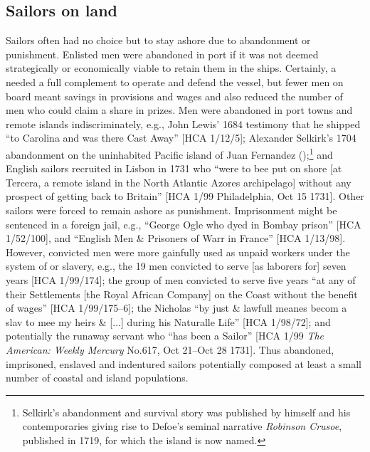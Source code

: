 \subsection{{Sailors on land}}\label{sec:4.3.5}

Sailors often had no choice but to stay ashore due to abandonment or punishment. Enlisted men were abandoned in port if it was not deemed strategically or economically viable to retain them in the ships. Certainly, a  needed a full complement to operate and defend the vessel, but fewer men on board meant savings in provisions and wages and also reduced the number of men who could claim a share in prizes. Men were abandoned in port towns and remote islands indiscriminately, e.g., John Lewis’ 1684 testimony that he shipped “to Carolina and was there Cast Away” [HCA 1/12/5]; Alexander Selkirk’s 1704 abandonment on the uninhabited Pacific island of Juan Fernandez  (\citealt{Souhami2013});\footnote{Selkirk’s abandonment and survival story was published by himself and his contemporaries giving rise to Defoe’s seminal narrative \textit{Robinson Crusoe}, published in 1719, for which the island is now named.} and English sailors recruited in Lisbon in 1731 who “were to bee put on shore [at Tercera, a remote island in the North Atlantic Azores archipelago] without any prospect of getting back to Britain” [HCA 1/99 Philadelphia, Oct 15 1731]. Other sailors were forced to remain ashore as punishment. Imprisonment might be sentenced in a foreign jail, e.g., “George Ogle who dyed in Bombay prison” [HCA 1/52/100], and “English Men \& Prisoners of Warr in France” [HCA 1/13/98]. However, convicted men were more gainfully used as unpaid workers under the system of  or slavery, e.g., the 19 men convicted to serve [as laborers for] seven years [HCA 1/99/174]; the group of men convicted to serve five years “at any of their Settlements [the Royal African Company] on the Coast without the benefit of wages” [HCA 1/99/175–6]; the  Nicholas “by just \& lawfull meanes becom a slav to mee my heirs \& [...] during his Naturalle Life” [HCA 1/98/72]; and potentially the runaway servant who “has been a Sailor” [HCA 1/99 \textit{The American: Weekly Mercury} No.617, Oct 21–Oct 28 1731]. Thus abandoned, imprisoned, enslaved and indentured sailors potentially composed at least a small number of coastal and island populations. 

